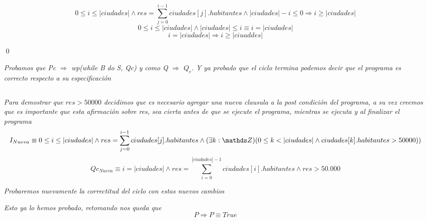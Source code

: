 \documentclass[10pt,a4paper]{article}
\begin{document}
\begin{demoPc}
\begin{demo4}
		\end{demo4}
		
		
		
		
		
		\begin{demo5}
			\[
			0 \leq i \leq \lvert ciudades\rvert \land res= \sum_{j=0}^{i-1} ciudades[j].habitantes \land |ciudades| -i\leq 0 \Longrightarrow i \geq |ciudades|
			\]
			\[
			0 \leq i \leq |ciudades| \land |ciudades| \leq i \equiv i =|ciudades| 
			\]
			\[i=|ciudades| \Longrightarrow i \geq |ciuaddes|\]
			
			
			\qed \\
			
		\end{demo5}
		\noindent \textit{\emph{Probamos que Pc $\Longrightarrow$ wp(while B do S, Qc)
				y como Q $\Longrightarrow$ $Q_{c}$. 
				Y ya probado que el ciclo termina podemos decir que el programa es correcto respecto a su especificación} }
		
	\end{demoPc}
	
	\setcounter{subsection}{1}
	\subsection{}
	\noindent\textit{Para demostrar que $res>50000$ decidimos que es necesario agregar una nueva clausula a la post condición del programa, a su vez creemos que es importante que esta afirmación sobre res, sea cierta antes de que se ejecute el programa, mientras se ejecuta y al finalizar el programa}
	\[I_{Nueva} \equiv 0 \leq i \leq |ciudades| \land res= \sum_{j=0}^{i-1} ciudades[j].habitantes \land (\exists k: \ent)(0 \leq k < |ciudades| \land 
	ciudades[k].habitantes > 50000)) \]
	\[Qc_{Nueva}\equiv i=\lvert ciudades\rvert \land  res= \sum_{i=0}^{|ciudades|-1} ciudades[i].habitantes \land  res >50.000 \]
	
	
	\noindent \textit{Probaremos nuevamente la correctitud del ciclo con estas nuevos cambios }
	
	\begin{demo1}
		\textit{Esto ya lo hemos probado, retomando nos queda que}
		\[P \Longrightarrow P \equiv True\]
	\end{demo1}
	
\end{document}
